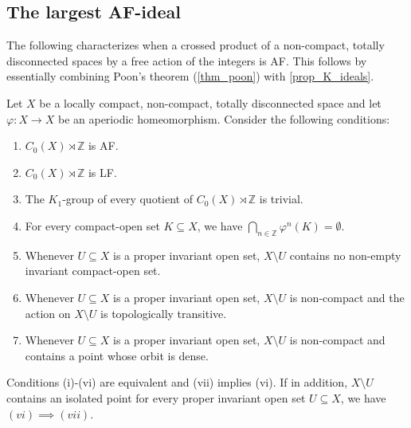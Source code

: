 \documentclass[12pt, a4paper, oneside]{amsart}
\newcommand{\0}{\mathbf{0}}
\newcommand{\1}{\mathbf{1}}
\newcommand{\Z}{\mathbb{Z}}   %
\begin{document}
	\subsection{The largest AF-ideal}
	
	The following characterizes when a crossed product of a non-compact, totally disconnected spaces by a free action of the integers is AF. This follows by essentially combining Poon's theorem (\cref{thm_poon}) with \cref{prop_K_ideals}. 
	
		\begin{theorem}
		\label{thm_poon_deluxe}
		Let \(X\) be a locally compact, non-compact, totally disconnected space and let \(\varphi \colon X \to X\) be an aperiodic homeomorphism. Consider the following conditions: 
		\begin{enumerate}
			\item \(C_0(X) \rtimes  \Z\) is AF. 
			\item \(C_0(X) \rtimes  \Z\) is LF. 
			\item The \(K_1\)-group of every quotient of \(C_0(X) \rtimes  \Z\) is trivial. 
			\item For every compact-open set \(K \subseteq X\), we have \(\bigcap_{n \in \Z} \varphi^n(K) = \emptyset\). 
			\item Whenever \(U \subseteq X\) is a proper invariant open set, \(X \setminus U\) contains no non-empty invariant compact-open set. 
			\item Whenever \(U \subseteq X\) is a proper invariant open set, \(X \setminus U\) is non-compact and the action on \(X \setminus U\) is topologically transitive. 
			\item Whenever \(U \subseteq X\) is a proper invariant open set, \(X \setminus U\) is non-compact and contains a point whose orbit is dense. 
		\end{enumerate}
		Conditions (i)-(vi) are equivalent and (vii) implies (vi). If in addition, \(X \setminus U\) contains an isolated point for every proper invariant open set \(U \subseteq X\), we have \((vi) \implies (vii)\). 
	\end{theorem}
\end{document}
